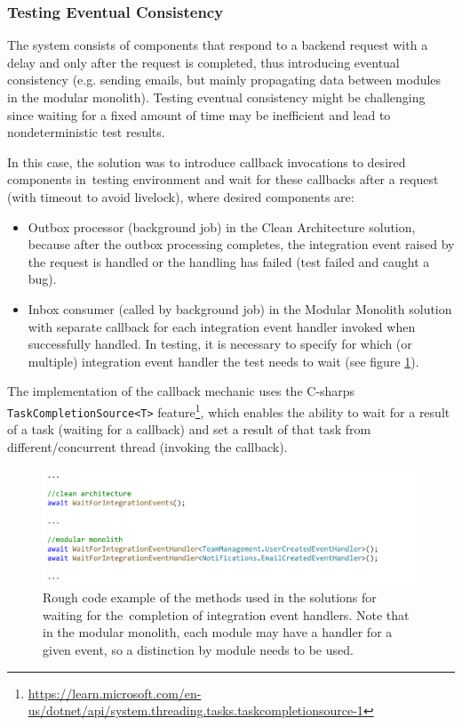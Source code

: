 \subsubsection{Testing Eventual Consistency}
The system consists of components that respond to a backend request with a delay and only after the request is completed, thus introducing eventual consistency (e.g. sending emails, but mainly propagating data between modules in the modular monolith). Testing eventual consistency might be challenging since waiting for a fixed amount of time may be inefficient and lead to nondeterministic test results.

In this case, the solution was to introduce callback invocations to desired components in~testing environment and wait for these callbacks after a request (with timeout to avoid livelock), where desired components are:
\begin{itemize}
    \item Outbox processor (background job) in the Clean Architecture solution, because after the outbox processing completes, the integration event raised by the request is handled or the handling has failed (test failed and caught a bug).
    
    \item Inbox consumer (called by background job) in the Modular Monolith solution with separate callback for each integration event handler invoked when successfully handled. In testing, it is necessary to specify for which (or multiple) integration event handler the test needs to wait (see figure \ref{fig:eventual_constistency_testing}).
\end{itemize}

The implementation of the callback mechanic uses the C-sharps \texttt{TaskCompletionSource<T>} feature\footnote{\url{https://learn.microsoft.com/en-us/dotnet/api/system.threading.tasks.taskcompletionsource-1}}, which enables the ability to wait for a result of a task (waiting for a callback) and set a result of that task from different/concurrent thread (invoking the callback).

\begin{figure} [H]
    \centering
    \includegraphics[width=\textwidth]{figures/eventual-consistency.pdf}
    \caption{Rough code example of the methods used in the solutions for waiting for the~completion of integration event handlers. Note that in the modular monolith, each module may have a handler for a given event, so a distinction by module needs to be used.}
    \label{fig:eventual_constistency_testing}
\end{figure}

